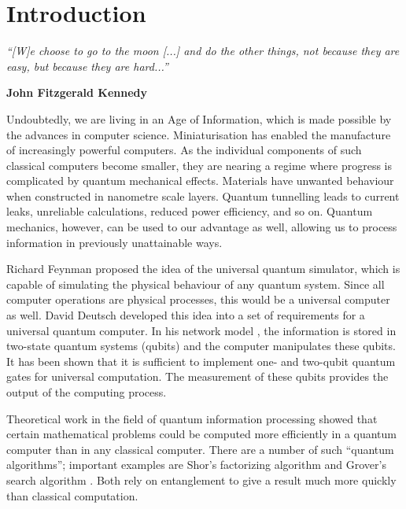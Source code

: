 \setcounter{chapter}{0} %
\chapter{Introduction}
\label{chapter:introduction}

\setlength{\epigraphrule}{0pt}
\renewcommand{\epigraphflush}{center}
\setlength{\epigraphwidth}{11cm}
\epigraph{\textit{``[W]e choose to go to the moon [...] and do the other things, not because they are easy, but because they are hard...''}}{\textbf{John Fitzgerald Kennedy}}

Undoubtedly, we are living in an Age of Information, which is made possible by the advances in computer science. Miniaturisation has enabled the manufacture of increasingly powerful computers. As the individual components of such classical computers become smaller, they are nearing a regime where progress is complicated by quantum mechanical effects. Materials have unwanted behaviour when constructed in nanometre scale layers. Quantum tunnelling leads to current leaks, unreliable calculations, reduced power efficiency, and so on. Quantum mechanics, however, can be used to our advantage as well, allowing us to process information in previously unattainable ways. 

Richard Feynman \cite{Feynman1982,Feynman1986} proposed the idea of the universal quantum simulator, which is capable of simulating the physical behaviour of any quantum system. Since all computer operations are physical processes, this would be a universal computer as well. David Deutsch \cite{Deutsch1989} developed this idea into a set of requirements for a universal quantum computer. In his network model \cite{Deutsch1989}, the information is stored in two-state quantum systems (qubits) and the computer manipulates these qubits. It has been shown \cite{Barenco1995,Sleator1995} that it is sufficient to implement one- and two-qubit quantum gates for universal computation. The measurement of these qubits provides the output of the computing process.

Theoretical work in the field of quantum information processing showed that certain mathematical problems could be computed more efficiently in a quantum computer than in any classical computer. There are a number of such ``quantum algorithms''; important examples are Shor's factorizing algorithm \cite{Shor1994} and Grover's search algorithm \cite{Grover1997}. Both rely on entanglement to give a result much more quickly than classical computation.

